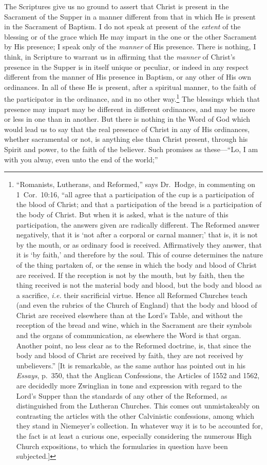 \documentclass[
  english,
]{book}
\begin{document}
The Scriptures give us no ground to assert that Christ is present in the Sacrament of the Supper in a manner different from that in which He is present in the Sacrament of Baptism. I do not speak at present of the \emph{extent} of the blessing or of the grace which He may impart in the one or the other Sacrament by His presence; I speak only of the \emph{manner} of His presence. There is nothing, I think, in Scripture to warrant us in affirming that the \emph{manner} of Christ's presence in the Supper is in itself unique or peculiar, or indeed in any respect different from the manner of His presence in Baptism, or any other of His own ordinances. In all of these He is present, after a spiritual manner, to the faith of the participator in the ordinance, and in no other way.\footnote{``Romanists, Lutherans, and Reformed,'' says Dr.~Hodge, in commenting on 1~Cor.~10:16, ``all agree that a participation of the cup is a participation of the blood of Christ; and that a participation of the bread is a participation of the body of Christ. But when it is asked, what is the nature of this participation, the answers given are radically different. The Reformed answer negatively, that it is `not after a corporal or carnal manner;' that is, it is not by the mouth, or as ordinary food is received. Affirmatively they answer, that it is `by faith,' and therefore by the soul. This of course determines the nature of the thing partaken of, or the sense in which the body and blood of Christ are received. If the reception is not by the mouth, but by faith, then the thing received is not the material body and blood, but the body and blood as a sacrifice, \emph{i.e.} their sacrificial virtue. Hence all Reformed Churches teach (and even the rubrics of the Church of England) that the body and blood of Christ are received elsewhere than at the Lord's Table, and without the reception of the bread and wine, which in the Sacrament are their symbols and the organs of communication, as elsewhere the Word is that organ. Another point, no less clear as to the Reformed doctrine, is, that since the body and blood of Christ are received by faith, they are not received by unbelievers.'' {[}It is remarkable, as the same author has pointed out in his \emph{Essays}, p.~350, that the Anglican Confessions, the Articles of 1552 and 1562, are decidedly more Zwinglian in tone and expression with regard to the Lord's Supper than the standards of any other of the Reformed, as distinguished from the Lutheran Churches. This comes out unmistakeably on contrasting the articles with the other Calvinistic confessions, among which they stand in Niemeyer's collection. In whatever way it is to be accounted for, the fact is at least a curious one, especially considering the numerous High Church expositions, to which the formularies in question have been subjected.{]}} The blessings which that presence may impart may be different in different ordinances, and may be more or less in one than in another. But there is nothing in the Word of God which would lead us to say that the real presence of Christ in any of His ordinances, whether sacramental or not, is anything else than Christ present, through his Spirit and power, to the faith of the believer. Such promises as these---``Lo, I am with you alway, even unto the end of the world;'' 
\end{document}
